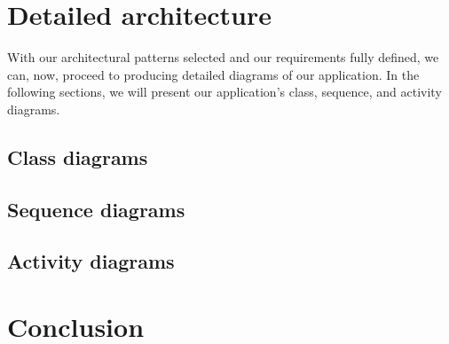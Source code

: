 \section{Detailed architecture}

With our architectural patterns selected and our requirements fully defined, we can, now, proceed to producing detailed diagrams of our application. In the following sections, we will present our application's class, sequence, and activity diagrams.
\subsection{Class diagrams}
\subsection{Sequence diagrams}
\subsection{Activity diagrams}
\section{Conclusion}